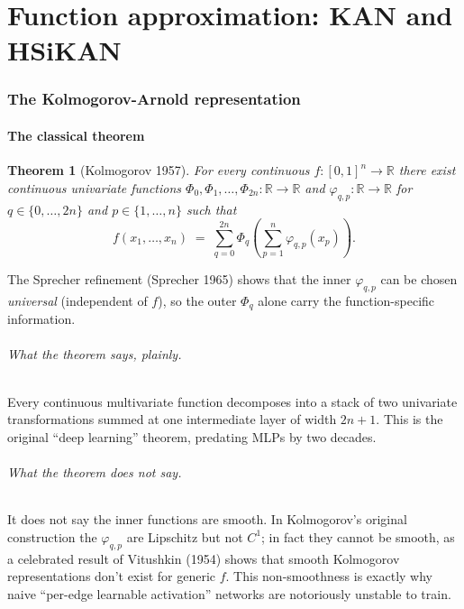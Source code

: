 \documentclass[11pt,a4paper]{article}
\newtheorem{theorem}{Theorem}[section]
\theoremstyle{remark}
\newcommand{\R}{\mathbb{R}}
\begin{document}
\bigskip
\part{Function approximation: KAN and HSiKAN}

\section{The Kolmogorov-Arnold representation}\label{sec:ka}

\subsection{The classical theorem}

\begin{theorem}[Kolmogorov 1957]\label{thm:kolmogorov}
For every continuous $f : [0, 1]^n \to \R$ there exist continuous
univariate functions
$\Phi_0, \Phi_1, \dots, \Phi_{2n} : \R \to \R$ and
$\varphi_{q, p} : \R \to \R$ for $q \in \{0, \dots, 2n\}$ and
$p \in \{1, \dots, n\}$ such that
\[
  f(x_1, \dots, x_n) \;=\; \sum_{q = 0}^{2n} \Phi_q\!\left( \sum_{p = 1}^{n} \varphi_{q, p}(x_p) \right).
\]
\end{theorem}

The Sprecher refinement (Sprecher 1965) shows that the inner
$\varphi_{q, p}$ can be chosen \emph{universal} (independent of $f$),
so the outer $\Phi_q$ alone carry the function-specific information.

\paragraph{What the theorem says, plainly.} Every continuous
multivariate function decomposes into a stack of two univariate
transformations summed at one intermediate layer of width $2n + 1$.
This is the original ``deep learning'' theorem, predating MLPs by
two decades.

\paragraph{What the theorem does \emph{not} say.} It does not say
the inner functions are smooth. In Kolmogorov's original
construction the $\varphi_{q, p}$ are Lipschitz but not $C^1$;
in fact they cannot be smooth, as a celebrated result of Vitushkin
(1954) shows that smooth Kolmogorov representations don't exist
for generic $f$. This non-smoothness is exactly why naive
``per-edge learnable activation'' networks are notoriously
unstable to train.
\end{document}
